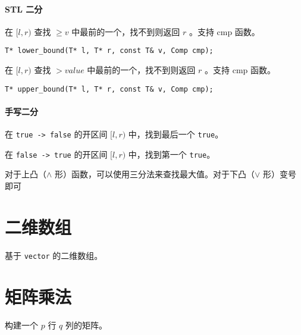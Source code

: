\documentclass{probook}
\begin{document}
\begin{multicols}{2}
\paragraph*{STL 二分}

在 $[l,r)$ 查找 $\geqslant v$ 中最前的一个，找不到则返回 $r$ 。支持 cmp 函数。

\begin{lstlisting}[style=cpp]
T* lower_bound(T* l, T* r, const T& v, Comp cmp);
\end{lstlisting}

在 $[l,r)$ 查找 $> value$ 中最前的一个，找不到则返回 $r$ 。支持 cmp 函数。

\begin{lstlisting}[style=cpp]
T* upper_bound(T* l, T* r, const T& v, Comp cmp);
\end{lstlisting}

\paragraph*{手写二分}

在 \lstinline{true -> false} 的开区间 $[l, r)$ 中，找到最后一个 \lstinline{true}。



在 \lstinline{false -> true} 的开区间 $[l, r)$ 中，找到第一个 \lstinline{true}。



对于上凸（$\wedge$ 形）函数，可以使用三分法来查找最大值。对于下凸（$\vee$ 形）变号即可



\section{二维数组}

基于 \lstinline{vector} 的二维数组。



\section{矩阵乘法}

构建一个 $p$ 行 $q$ 列的矩阵。




\end{multicols}
\end{document}
